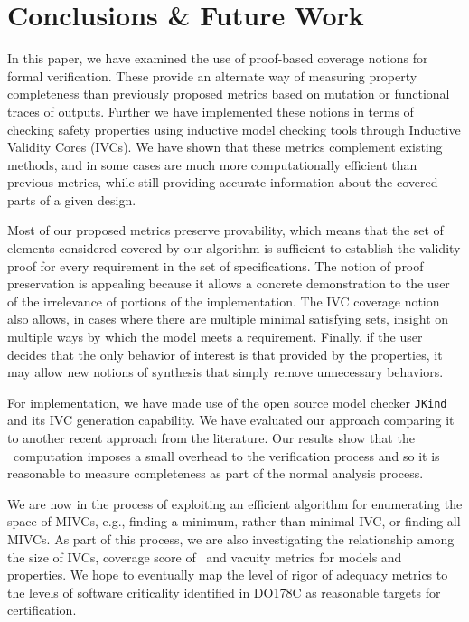\section{Conclusions \& Future Work}
\label{sec:conclusion}

In this paper, we have examined the use of proof-based coverage notions for formal verification.  These provide an alternate way of measuring property completeness than previously proposed metrics based on mutation or functional traces of outputs.
Further we have implemented these notions in terms of checking safety properties using inductive model checking tools through Inductive Validity Cores (IVCs).  We have shown that these metrics complement existing methods, and in some cases are much more computationally efficient than previous metrics, while still providing accurate information about the covered parts of a given design.

Most of our proposed metrics preserve provability, which means that the set of elements considered covered by our algorithm is sufficient to establish the validity proof for every requirement in the set of specifications.  The notion of proof preservation is appealing because it allows a concrete demonstration to the user of the irrelevance of portions of the implementation.  The IVC coverage notion also allows, in cases where there are multiple minimal satisfying sets, insight on multiple ways by which the model meets a requirement.
Finally, if the user decides that the only behavior of interest is that provided by the properties, it may allow new notions of synthesis that simply remove unnecessary behaviors.

For implementation, we have made use of the open source model checker \texttt{JKind} and its IVC generation capability. We have evaluated our approach comparing it to another recent approach from the literature.  Our results show that the \ivccov\ computation imposes a small overhead to the verification process and so it is reasonable to measure completeness as part of the normal analysis process.

We are now in the process of exploiting an efficient algorithm for enumerating the space of MIVCs, e.g., finding a minimum, rather than minimal IVC, or finding all MIVCs. As part of this process, we are also investigating the relationship among the size of IVCs, coverage score of \ivccov\, and vacuity metrics for models and properties.  We hope to eventually map the level of rigor of adequacy metrics to the levels of software criticality identified in DO178C as reasonable targets for certification.

